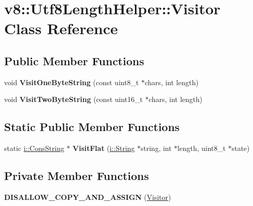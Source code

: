 \hypertarget{classv8_1_1_utf8_length_helper_1_1_visitor}{}\section{v8\+:\+:Utf8\+Length\+Helper\+:\+:Visitor Class Reference}
\label{classv8_1_1_utf8_length_helper_1_1_visitor}
\subsection*{Public Member Functions}
\begin{DoxyCompactItemize}
\item 
void {\bfseries Visit\+One\+Byte\+String} (const uint8\+\_\+t $\ast$chars, int length)\hypertarget{classv8_1_1_utf8_length_helper_1_1_visitor_ae0aef11aceb740bf3ee80ecc88961379}{}\label{classv8_1_1_utf8_length_helper_1_1_visitor_ae0aef11aceb740bf3ee80ecc88961379}

\item 
void {\bfseries Visit\+Two\+Byte\+String} (const uint16\+\_\+t $\ast$chars, int length)\hypertarget{classv8_1_1_utf8_length_helper_1_1_visitor_a6cbaec22819779f9984d3e8f62cdc9c3}{}\label{classv8_1_1_utf8_length_helper_1_1_visitor_a6cbaec22819779f9984d3e8f62cdc9c3}

\end{DoxyCompactItemize}
\subsection*{Static Public Member Functions}
\begin{DoxyCompactItemize}
\item 
static \hyperlink{classv8_1_1internal_1_1_cons_string}{i\+::\+Cons\+String} $\ast$ {\bfseries Visit\+Flat} (\hyperlink{classv8_1_1internal_1_1_string}{i\+::\+String} $\ast$string, int $\ast$length, uint8\+\_\+t $\ast$state)\hypertarget{classv8_1_1_utf8_length_helper_1_1_visitor_ace99ffd273ae10ad88bdd4ed95e8a36b}{}\label{classv8_1_1_utf8_length_helper_1_1_visitor_ace99ffd273ae10ad88bdd4ed95e8a36b}

\end{DoxyCompactItemize}
\subsection*{Private Member Functions}
\begin{DoxyCompactItemize}
\item 
{\bfseries D\+I\+S\+A\+L\+L\+O\+W\+\_\+\+C\+O\+P\+Y\+\_\+\+A\+N\+D\+\_\+\+A\+S\+S\+I\+GN} (\hyperlink{classv8_1_1_utf8_length_helper_1_1_visitor}{Visitor})\hypertarget{classv8_1_1_utf8_length_helper_1_1_visitor_a981c3ea8a41536e75cef6b59b87b201b}{}\label{classv8_1_1_utf8_length_helper_1_1_visitor_a981c3ea8a41536e75cef6b59b87b201b}

\end{DoxyCompactItemize}
